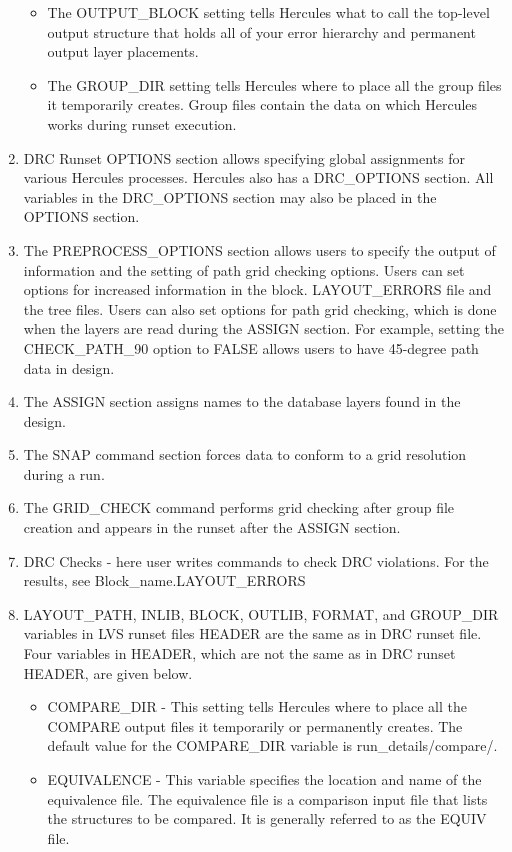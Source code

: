 \documentclass[a4paper,12pt,twoside]{article}
\begin{document}
\begin{enumerate}
\begin{itemize}
        \item The OUTPUT\_BLOCK setting tells Hercules what to call the top-level output structure that holds all of your error hierarchy and permanent output layer placements.
        \item The GROUP\_DIR setting tells Hercules where to place all the group files it temporarily creates. Group files contain the data on which Hercules works during runset execution.
    \end{itemize}
    \item DRC Runset OPTIONS section allows specifying global assignments for various Hercules processes. Hercules also has a DRC\_OPTIONS section. All variables in the DRC\_OPTIONS section may also be placed in the OPTIONS section.
    \item The PREPROCESS\_OPTIONS section allows users to specify the output of information and the setting of path grid checking options. Users can set options for increased information in the block. LAYOUT\_ERRORS file and the tree files. Users can also set options for path grid checking, which is done when the layers are read during the ASSIGN section. For example, setting the CHECK\_PATH\_90 option to FALSE allows users to have 45-degree path data in design.
    \item The ASSIGN section assigns names to the database layers found in the design.
    \item The SNAP command section forces data to conform to a grid resolution during a run.
    \item The GRID\_CHECK command performs grid checking after group file creation and appears in the runset after the ASSIGN section.
    \item DRC Checks - here user writes commands to check DRC violations. For the results, see Block\_name.LAYOUT\_ERRORS
    \item LAYOUT\_PATH, INLIB, BLOCK, OUTLIB, FORMAT, and GROUP\_DIR variables in LVS runset files HEADER are the same as in DRC runset file. Four variables in HEADER, which are not the same as in DRC runset HEADER, are given below.
    \begin{itemize}
        \item COMPARE\_DIR - This setting tells Hercules where to place all the COMPARE output files it temporarily or permanently creates. The default value for the COMPARE\_DIR variable is run\_details/compare/.
        \item EQUIVALENCE - This variable specifies the location and name of the equivalence file. The equivalence file is a comparison input file that lists the structures to be compared. It is generally referred to as the EQUIV file.

\end{itemize}
\end{enumerate}
\end{document}

